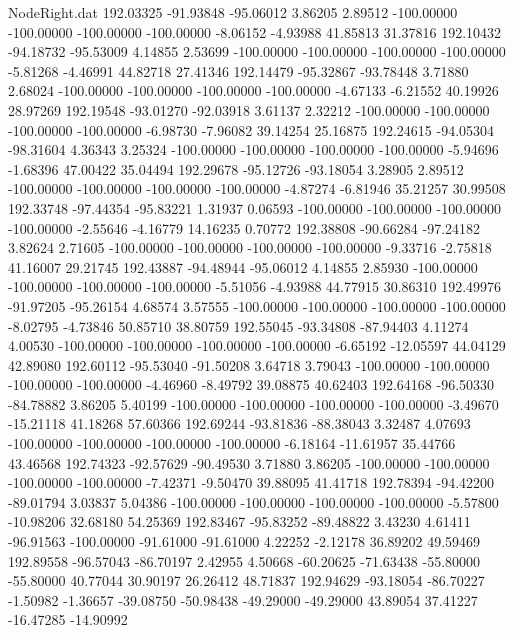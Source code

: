 \begin{filecontents}{NodeRight.dat}
 192.03325  -91.93848  -95.06012     3.86205    2.89512 -100.00000 -100.00000 -100.00000 -100.00000   -8.06152   -4.93988   41.85813   31.37816
 192.10432  -94.18732  -95.53009     4.14855    2.53699 -100.00000 -100.00000 -100.00000 -100.00000   -5.81268   -4.46991   44.82718   27.41346
 192.14479  -95.32867  -93.78448     3.71880    2.68024 -100.00000 -100.00000 -100.00000 -100.00000   -4.67133   -6.21552   40.19926   28.97269
 192.19548  -93.01270  -92.03918     3.61137    2.32212 -100.00000 -100.00000 -100.00000 -100.00000   -6.98730   -7.96082   39.14254   25.16875
 192.24615  -94.05304  -98.31604     4.36343    3.25324 -100.00000 -100.00000 -100.00000 -100.00000   -5.94696   -1.68396   47.00422   35.04494
 192.29678  -95.12726  -93.18054     3.28905    2.89512 -100.00000 -100.00000 -100.00000 -100.00000   -4.87274   -6.81946   35.21257   30.99508
 192.33748  -97.44354  -95.83221     1.31937    0.06593 -100.00000 -100.00000 -100.00000 -100.00000   -2.55646   -4.16779   14.16235    0.70772
 192.38808  -90.66284  -97.24182     3.82624    2.71605 -100.00000 -100.00000 -100.00000 -100.00000   -9.33716   -2.75818   41.16007   29.21745
 192.43887  -94.48944  -95.06012     4.14855    2.85930 -100.00000 -100.00000 -100.00000 -100.00000   -5.51056   -4.93988   44.77915   30.86310
 192.49976  -91.97205  -95.26154     4.68574    3.57555 -100.00000 -100.00000 -100.00000 -100.00000   -8.02795   -4.73846   50.85710   38.80759
 192.55045  -93.34808  -87.94403     4.11274    4.00530 -100.00000 -100.00000 -100.00000 -100.00000   -6.65192  -12.05597   44.04129   42.89080
 192.60112  -95.53040  -91.50208     3.64718    3.79043 -100.00000 -100.00000 -100.00000 -100.00000   -4.46960   -8.49792   39.08875   40.62403
 192.64168  -96.50330  -84.78882     3.86205    5.40199 -100.00000 -100.00000 -100.00000 -100.00000   -3.49670  -15.21118   41.18268   57.60366
 192.69244  -93.81836  -88.38043     3.32487    4.07693 -100.00000 -100.00000 -100.00000 -100.00000   -6.18164  -11.61957   35.44766   43.46568
 192.74323  -92.57629  -90.49530     3.71880    3.86205 -100.00000 -100.00000 -100.00000 -100.00000   -7.42371   -9.50470   39.88095   41.41718
 192.78394  -94.42200  -89.01794     3.03837    5.04386 -100.00000 -100.00000 -100.00000 -100.00000   -5.57800  -10.98206   32.68180   54.25369
 192.83467  -95.83252  -89.48822     3.43230    4.61411  -96.91563 -100.00000  -91.61000  -91.61000    4.22252   -2.12178   36.89202   49.59469
 192.89558  -96.57043  -86.70197     2.42955    4.50668  -60.20625  -71.63438  -55.80000  -55.80000   40.77044   30.90197   26.26412   48.71837
 192.94629  -93.18054  -86.70227    -1.50982   -1.36657  -39.08750  -50.98438  -49.29000  -49.29000   43.89054   37.41227  -16.47285  -14.90992

\end{filecontents}
